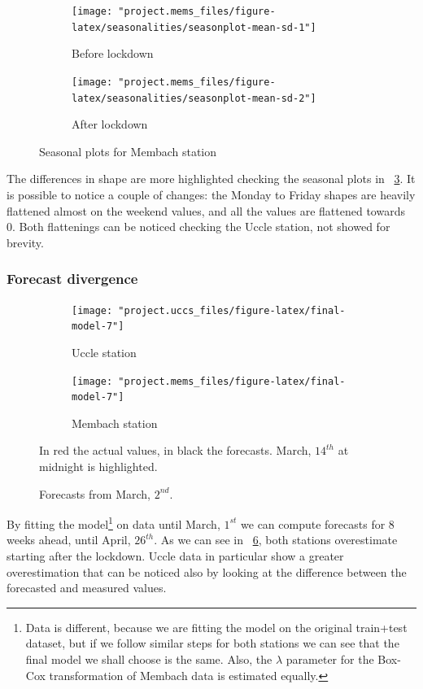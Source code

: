 \documentclass[12pt]{article}
\begin{document}
\begin{figure}[h]
	\begin{subfigure}{.5\linewidth}
		\texttt{[image: "project.mems\_files/figure-latex/seasonalities/seasonplot-mean-sd-1"]}
		\caption{Before lockdown}
		\label{fig:season.lockdown:msb:mems}
	\end{subfigure}
	\begin{subfigure}{.5\linewidth}
		\texttt{[image: "project.mems\_files/figure-latex/seasonalities/seasonplot-mean-sd-2"]}
		\caption{After lockdown}
		\label{fig:season.lockdown:msa:mems}
	\end{subfigure}
	\begin{center}
		\caption{Seasonal plots for Membach station}
		\label{fig:season.lockdown:ms:mems}
	\end{center}
\end{figure}

The differences in shape are more highlighted checking the seasonal plots \cite{hyndman2018forecasting} in \figurename~\ref{fig:season.lockdown:ms:mems}. It is possible to notice a couple of changes: the Monday to Friday shapes are heavily flattened almost on the weekend values, and all the values are flattened towards 0. Both flattenings can be noticed checking the Uccle station, not showed for brevity.

\subsubsection{Forecast divergence}
\begin{figure}[h]
	\begin{subfigure}{.5\linewidth}
		\texttt{[image: "project.uccs\_files/figure-latex/final-model-7"]}
		\caption{Uccle station}
		\label{fig:forecast.lockdown:uccs}
	\end{subfigure}
	\begin{subfigure}{.5\linewidth}
		\texttt{[image: "project.mems\_files/figure-latex/final-model-7"]}
		\caption{Membach station}
		\label{fig:forecast.lockdown:mems}
	\end{subfigure}
	\begin{center}
		\caption{Forecasts from March, $2^{nd}$.}{\small In red the actual values, in black the forecasts. March, $14^{th}$ at midnight is highlighted.}
		\label{fig:forecast.lockdown}
	\end{center}
\end{figure}

By fitting the model\footnote{Data is different, because we are fitting the model on the original train+test dataset, but if we follow similar steps for both stations we can see that the final model we shall choose is the same. Also, the $\lambda$ parameter for the Box-Cox transformation of Membach data is estimated equally.} on data until March, $1^{st}$ we can compute forecasts for 8 weeks ahead, until April, $26^{th}$. As we can see in \figurename~\ref{fig:forecast.lockdown}, both stations overestimate starting after the lockdown. Uccle data in particular show a greater overestimation that can be noticed also by looking at the difference between the forecasted and measured values.
\end{document}
